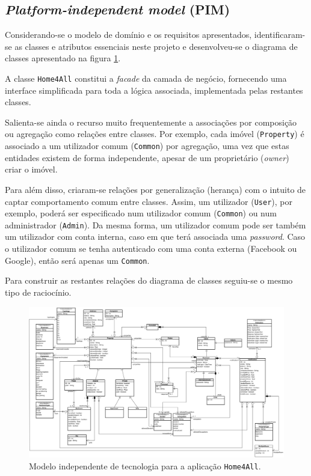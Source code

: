 \subsection{\textit{Platform-independent model} (PIM)}

Considerando-se o modelo de domínio e os requisitos apresentados, identificaram-se as classes e atributos essenciais neste projeto e desenvolveu-se o diagrama de classes apresentado na figura \ref{fig:diagrama_classes}.

A classe \texttt{Home4All} constitui a \textit{facade} da camada de negócio, fornecendo uma interface simplificada para toda a lógica associada, implementada pelas restantes classes.

Salienta-se ainda o recurso muito frequentemente a associações por composição ou agregação como relações entre classes. Por exemplo, cada imóvel (\texttt{Property}) é associado a um utilizador comum (\texttt{Common}) por agregação, uma vez que estas entidades existem de forma independente, apesar de um proprietário (\textit{owner}) criar o imóvel.

Para além disso, criaram-se relações por generalização (herança) com o intuito de captar comportamento comum entre classes. Assim, um utilizador (\texttt{User}), por exemplo, poderá ser especificado num utilizador comum (\texttt{Common}) ou num administrador (\texttt{Admin}). Da mesma forma, um utilizador comum pode ser também um utilizador com conta interna, caso em que terá associada uma \textit{password}. Caso o utilizador comum se tenha autenticado com uma conta externa (Facebook ou Google), então será apenas um \texttt{Common}.

Para construir as restantes relações do diagrama de classes seguiu-se o mesmo tipo de raciocínio.

\begin{landscape}
    \begin{figure}[!ht]
        \centering
        \includegraphics[width=1.6\textwidth]{images/PIM.png}
        \caption{Modelo independente de tecnologia para a aplicação \texttt{Home4All}.}
        \label{fig:diagrama_classes}
    \end{figure}    
\end{landscape}


